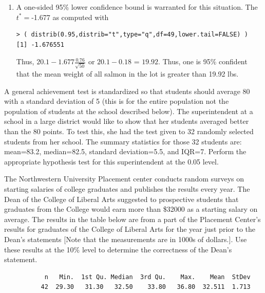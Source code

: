 \documentclass[10pt,openany]{book}\usepackage[]{graphicx}\usepackage[]{color}
\makeatletter
\newenvironment{kframe}{%
 \def\at@end@of@kframe{}%
 \ifinner\ifhmode%
  \def\at@end@of@kframe{\end{minipage}}%
  \begin{minipage}{\columnwidth}%
 \fi\fi%
 \def\FrameCommand##1{\hskip\@totalleftmargin \hskip-\fboxsep
 \colorbox{shadecolor}{##1}\hskip-\fboxsep
     \hskip-\linewidth \hskip-\@totalleftmargin \hskip\columnwidth}%
 \MakeFramed {\advance\hsize-\width
   \@totalleftmargin\z@ \linewidth\hsize
   \@setminipage}}%
 {\par\unskip\endMakeFramed%
 \at@end@of@kframe}
\newenvironment{knitrout}{}{} %
\makeatother
\begin{document}
\begin{enumerate}
    \item A one-sided 95\% lower confidence bound is warranted for this situation.  The $t^{*}=$-1.677 as computed with
\begin{knitrout}
\color{fgcolor}\begin{kframe}
\begin{verbatim}
> ( distrib(0.95,distrib="t",type="q",df=49,lower.tail=FALSE) )
[1] -1.676551
\end{verbatim}
\end{kframe}
\end{knitrout}
Thus, $20.1-1.677\frac{0.76}{\sqrt{50}}$ or $20.1-0.18$ = $19.92$.  Thus, one is 95\% confident that the mean weight of all salmon in the lot is greater than 19.92 lbs.
\end{enumerate}


\begin{exsection}
  \item \label{revex:tTestSuperInt} A general achievement test is standardized so that students should average 80 with a standard deviation of 5 (this is for the entire population not the population of students at the school described below).  The superintendent at a school in a large district would like to show that her students averaged better than the 80 points.  To test this, she had the test given to 32 randomly selected students from her school.  The summary statistics for those 32 students are: mean=83.2, median=82.5, standard deviation=5.5, and IQR=7.  Perform the appropriate hypothesis test for this superintendent at the 0.05 level. 

  \item \label{revex:tTestLASalary} The Northwestern University Placement center conducts random surveys on starting salaries of college graduates and publishes the results every year.  The Dean of the College of Liberal Arts suggested to prospective students that graduates from the College would earn more than \$32000 as a starting salary on average.  The results in the table below are from a part of the Placement Center's results for graduates of the College of Liberal Arts for the year just prior to the Dean's statements [Note that the measurements are in 1000s of dollars.].  Use these results at the 10\% level to determine the correctness of the Dean's statement. 
  \begin{center}
    \begin{Verbatim}
           n   Min.  1st Qu. Median  3rd Qu.    Max.    Mean  StDev
          42  29.30   31.30   32.50    33.80   36.80  32.511  1.713
    \end{Verbatim}
  \end{center}
\end{exsection}
\end{document}
